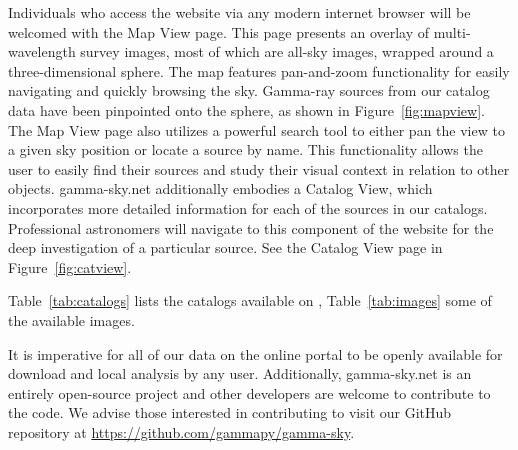 Individuals who access the website via any modern internet browser will be welcomed with the Map View page. This page presents an overlay of multi-wavelength survey images, most of which are all-sky images, wrapped around a three-dimensional sphere. The map features pan-and-zoom functionality for easily navigating and quickly browsing the sky. Gamma-ray sources from our catalog data have been pinpointed onto the sphere, as shown in Figure~\ref{fig:mapview}. The Map View page also utilizes a powerful search tool to either pan the view to a given sky position or locate a source by name. This functionality allows the user to easily find their sources and study their visual context in relation to other objects. gamma-sky.net additionally embodies a Catalog View, which incorporates more detailed information for each of the sources in our catalogs. Professional astronomers will navigate to this component of the website for the deep investigation of a particular source. See the Catalog View page in Figure~\ref{fig:catview}.

Table~\ref{tab:catalogs} lists the catalogs available on \gammasky, Table~\ref{tab:images} some of the available images.







It is imperative for all of our data on the online portal to be openly available for download and local analysis by any user. Additionally, gamma-sky.net is an entirely open-source project and other developers are welcome to contribute to the code. We advise those interested in contributing to visit our GitHub repository at \url{https://github.com/gammapy/gamma-sky}.

